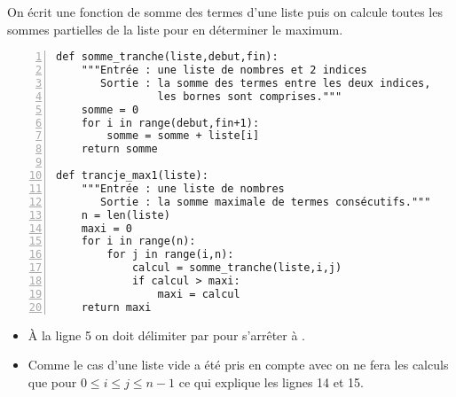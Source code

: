On écrit une fonction de somme des termes d'une liste puis on calcule toutes les sommes partielles de la liste pour en déterminer le maximum.
\begin{lstlisting}[numbers = left]
def somme_tranche(liste,debut,fin):
    """Entrée : une liste de nombres et 2 indices
       Sortie : la somme des termes entre les deux indices,
                les bornes sont comprises."""
    somme = 0
    for i in range(debut,fin+1): 
        somme = somme + liste[i]
    return somme
    
def trancje_max1(liste):
    """Entrée : une liste de nombres
       Sortie : la somme maximale de termes consécutifs."""
    n = len(liste)
    maxi = 0
    for i in range(n):
        for j in range(i,n):
            calcul = somme_tranche(liste,i,j)
            if calcul > maxi: 
                maxi = calcul
    return maxi
\end{lstlisting}
\begin{itemize}
\item À la ligne 5 on doit délimiter par  pour s'arrêter à .
\item Comme le cas d'une liste vide a été pris en compte avec  on ne fera les calculs que pour $0 \le i \le j \le n-1$ ce qui explique les lignes 14 et 15.
\end{itemize}

